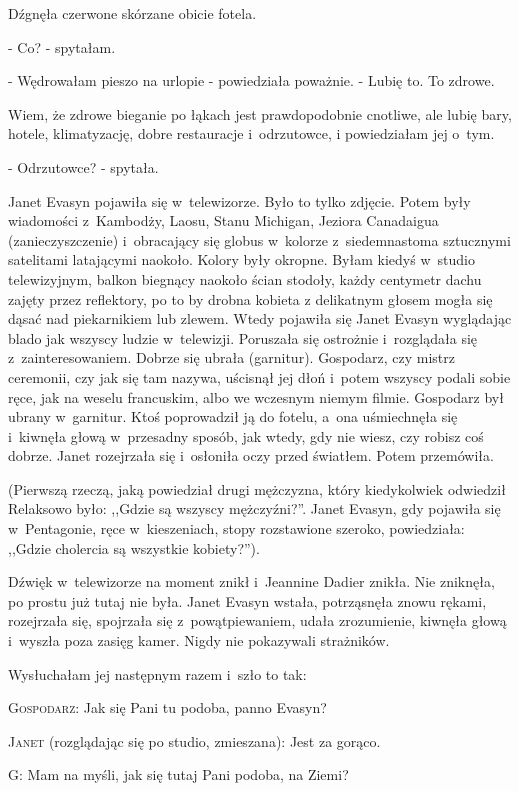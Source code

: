 \documentclass[oneside,polish,12pt,sfheadings]{mwbk}
\begin{document}
Dźgnęła czerwone skórzane obicie fotela. 

- Co? - spytałam.

- Wędrowałam pieszo na urlopie - powiedziała poważnie. - Lubię to.
To zdrowe.

Wiem, że zdrowe bieganie po łąkach jest prawdopodobnie cnotliwe, ale
lubię bary, hotele, klimatyzację, dobre restauracje i~odrzutowce,
i powiedziałam jej o~tym.

- Odrzutowce? - spytała.

Janet Evasyn pojawiła się w~telewizorze. Było to tylko zdjęcie. Potem
były wiadomości z~Kambodży, Laosu, Stanu Michigan, Jeziora Canadaigua
(zanieczyszczenie) i~obracający się globus w~kolorze z~siedemnastoma
sztucznymi satelitami latającymi naokoło. Kolory były okropne. Byłam
kiedyś w~studio telewizyjnym, balkon biegnący naokoło ścian stodoły,
każdy centymetr dachu zajęty przez reflektory, po to by drobna kobieta
z delikatnym głosem mogła się dąsać nad piekarnikiem lub zlewem. Wtedy
pojawiła się Janet Evasyn wyglądając blado jak wszyscy ludzie w~telewizji.
Poruszała się ostrożnie i~rozglądała się z~zainteresowaniem. Dobrze
się ubrała (garnitur). Gospodarz, czy mistrz ceremonii, czy jak się
tam nazywa, uścisnął jej dłoń i~potem wszyscy podali sobie ręce, jak
na weselu francuskim, albo we wczesnym niemym filmie. Gospodarz był
ubrany w~garnitur. Ktoś poprowadził ją do fotelu, a~ona uśmiechnęła
się i~kiwnęła głową w~przesadny sposób, jak wtedy, gdy nie wiesz,
czy robisz coś dobrze. Janet rozejrzała się i~osłoniła oczy przed
światłem. Potem przemówiła.

(Pierwszą rzeczą, jaką powiedział drugi mężczyzna, który kiedykolwiek
odwiedził Relaksowo było: ,,Gdzie są wszyscy mężczyźni?''. Janet Evasyn,
gdy pojawiła się w~Pentagonie, ręce w~kieszeniach, stopy rozstawione
szeroko, powiedziała: ,,Gdzie cholercia są wszystkie kobiety?'').

Dźwięk w~telewizorze na moment znikł i~Jeannine Dadier znikła. Nie
zniknęła, po prostu już tutaj nie była. Janet Evasyn wstała, potrząsnęła
znowu rękami, rozejrzała się, spojrzała się z~powątpiewaniem, udała
zrozumienie, kiwnęła głową i~wyszła poza zasięg kamer. Nigdy nie pokazywali
strażników.

Wysłuchałam jej następnym razem i~szło to tak: 

\textsc{Gospodarz}: Jak się Pani tu podoba, panno Evasyn?

\textsc{Janet} (rozglądając się po studio, zmieszana): Jest za gorąco.

G: Mam na myśli, jak się tutaj Pani podoba, na Ziemi?
\end{document}

